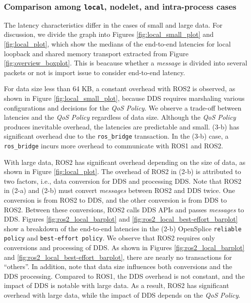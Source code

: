 \documentclass{sig-alternate-05-2015}
\begin{document}
\subsubsection{Comparison among \texttt{local}, nodelet, and intra-process cases}
\label{sec:local}
The latency characteristics differ in the cases of small and large data.
For discussion, we divide the graph into Figures \ref{fig:local_small_plot} and \ref{fig:local_plot}, which show the medians of the end-to-end latencies for local loopback and shared memory transport extracted from Figure \ref{fig:overview_boxplot}.
This is beacause whether a \emph{message} is divided into several packets or not is import issue to consider end-to-end latency.

For data size less than 64 KB, a constant overhead with ROS2 is observed, as shown in Figure \ref{fig:local_small_plot}, because DDS requires marshaling various configurations and decisions for the \emph{QoS Policy}.
We observe a trade-off between latencies and the \emph{QoS Policy} regardless of data size.
Although the \emph{QoS Policy} produces inevitable overhead, the latencies are predictable and small.
(3-b) has significant overhead due to the \texttt{ros\_bridge} transaction.
In the (3-b) case, a \texttt{ros\_bridge} incurs more overhead to communicate with ROS1 and ROS2.

With large data, ROS2 has significant overhead depending on the size of data, as shown in Figure \ref{fig:local_plot}.
The overhead of ROS2 in (2-b) is attributed to two factors, i.e., data conversion for DDS and processing DDS.
Note that ROS2 in (2-a) and (2-b) must convert \emph{messages} between ROS2 and DDS twice.
One conversion is from ROS2 to DDS, and the other conversion is from DDS to ROS2.
Between these conversions, ROS2 calls DDS APIs and passes \emph{messages} to DDS.
Figures \ref{fig:ros2_local_barplot} and \ref{fig:ros2_local_best-effort_barplot} show a breakdown of the end-to-end latencies in the (2-b) OpenSplice \texttt{reliable policy} and \texttt{best-effort policy}.
We observe that ROS2 requires only conversions and processing of DDS.
As shown in Figures \ref{fig:ros2_local_barplot} and \ref{fig:ros2_local_best-effort_barplot}, there are nearly no transactions for ``others''.
In addition, note that data size influences both conversions and the DDS processing.
Compared to ROS1, the DDS overhead is not constant, and the impact of DDS is notable with large data.
As a result, ROS2 has significant overhead with large data, while the impact of DDS depends on the \emph{QoS Policy}.
\end{document}
